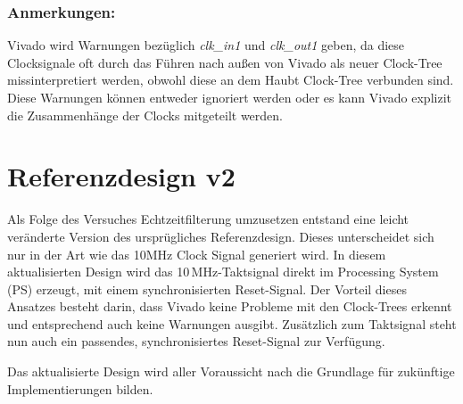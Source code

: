 \documentclass[
  ngerman,
  letterpaper,
  DIV=11]{scrreprt}
\begin{document}
\subsubsection{Anmerkungen:}\label{anmerkungen}

Vivado wird Warnungen bezüglich \emph{clk\_in1} und \emph{clk\_out1}
geben, da diese Clocksignale oft durch das Führen nach außen von Vivado
als neuer Clock-Tree missinterpretiert werden, obwohl diese an dem Haubt
Clock-Tree verbunden sind. Diese Warnungen können entweder ignoriert
werden oder es kann Vivado explizit die Zusammenhänge der Clocks
mitgeteilt werden.

\section{Referenzdesign v2}\label{referenzdesign-v2}

Als Folge des Versuches Echtzeitfilterung umzusetzen entstand eine
leicht veränderte Version des ursprügliches Referenzdesign. Dieses
unterscheidet sich nur in der Art wie das 10MHz Clock Signal generiert
wird. In diesem aktualisierten Design wird das 10\,MHz-Taktsignal direkt
im Processing System (PS) erzeugt, mit einem synchronisierten
Reset-Signal. Der Vorteil dieses Ansatzes besteht darin, dass Vivado
keine Probleme mit den Clock-Trees erkennt und entsprechend auch keine
Warnungen ausgibt. Zusätzlich zum Taktsignal steht nun auch ein
passendes, synchronisiertes Reset-Signal zur Verfügung.

Das aktualisierte Design wird aller Voraussicht nach die Grundlage für
zukünftige Implementierungen bilden.
\end{document}
